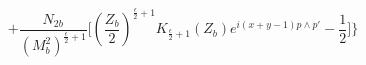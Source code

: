 \begin{equation}
+\frac{{N_{2b}}}{(M^{2}_{b})^{\frac{\epsilon}{2}+1}}\biggl[
\left(\frac{Z_{b}}{2}\right)^{\frac{\epsilon}{2}+1}K_{\frac{\epsilon}{2}+1}(Z_{b})e^{i(x+y-1)p\wedge
p'}-\frac{1}{2}\biggr] \biggr\}
\end{equation}

